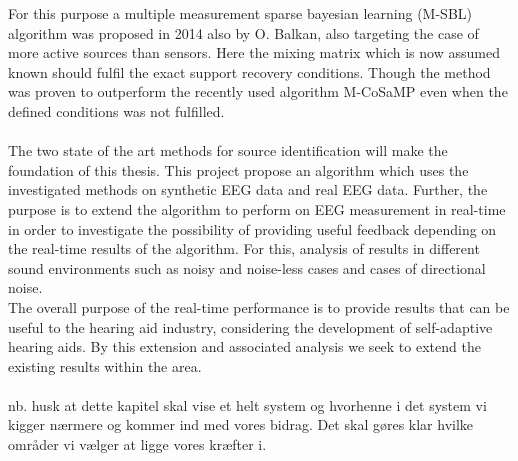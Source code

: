 For this purpose a multiple measurement sparse bayesian learning (M-SBL) algorithm was proposed in 2014 also by O. Balkan, also targeting the case of more active sources than sensors\cite{Balkan2014}. Here the mixing matrix which is now assumed known should fulfil the exact support recovery conditions. Though the method was proven to outperform the recently used algorithm M-CoSaMP even when the defined conditions was not fulfilled.  \\   
\\
The two state of the art methods for source identification will make the foundation of this thesis. This project propose an algorithm which uses the investigated methods on synthetic EEG data and real EEG data.
Further, the purpose is to extend the algorithm to perform on EEG measurement in real-time in order to investigate the possibility of providing useful feedback depending on the real-time results of the algorithm. 
For this, analysis of results in different sound environments such as noisy and noise-less cases and cases of directional noise.\\
The overall purpose of the real-time performance is to provide results that can be useful to the hearing aid industry, considering the development of self-adaptive hearing aids.
By this extension and associated analysis we seek to extend the existing results within the area.   
\\ \\


nb. husk at dette kapitel skal vise et helt system og hvorhenne i det system vi kigger nærmere og kommer ind med vores bidrag. Det skal gøres klar hvilke områder vi vælger at ligge vores kræfter i.  





 
